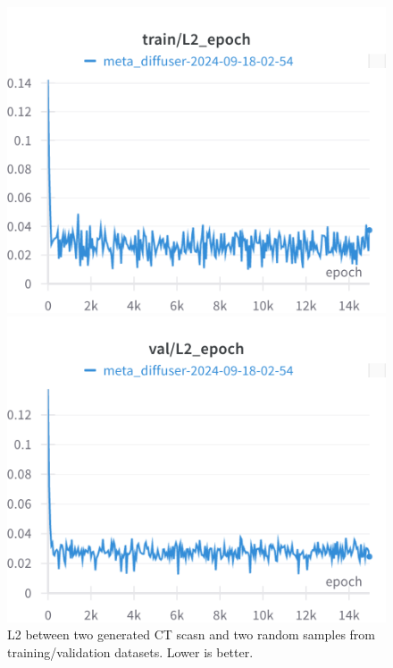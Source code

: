\begin{figure}[H]
\includegraphics[width=\linewidth]{detailed_engineering/Meta Diffusion/charts/train_l2_epoch.png}

\endminipage\hfill
{}
\includegraphics[width=\linewidth]{detailed_engineering/Meta Diffusion/charts/val_l2_epoch.png}

\endminipage
\caption{L2 between two generated CT scasn and two random samples from training/validation datasets. Lower is better.}
\end{figure}

